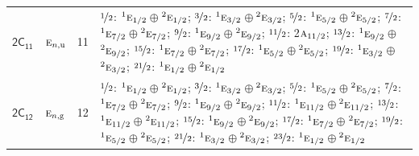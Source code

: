 \documentclass[10pt,a4paper]{article}
\numberwithin{equation}{section}
\newcommand{\grp}[1]{\mathsf{#1}}
\newcommand{\irr}[1]{\text{\normalfont\scshape #1}}
\newcommand{\conjpair}[1]{{}^{#1}}
\newcommand{\ptag}[1]{\mathrm{#1}}
\newlength{\fillwidth}\newlength{\cellwidth}\newlength{\colwidth}
\begin{document}
{\begin{longtable}{@{}llr>{\RaggedRight\arraybackslash}p{\fillwidth}@{}}
\href{2C11.pdf}{$\grp{2C_{11}}$} & $\irr{e}_{n,\ptag{u}}$ & 11 & $\nicefrac{1}{2}$: $\conjpair{1}\irr{e}_{1/2}$${}\oplus{}$$\conjpair{2}\irr{e}_{1/2}$; $\nicefrac{3}{2}$: $\conjpair{1}\irr{e}_{3/2}$${}\oplus{}$$\conjpair{2}\irr{e}_{3/2}$; $\nicefrac{5}{2}$: $\conjpair{1}\irr{e}_{5/2}$${}\oplus{}$$\conjpair{2}\irr{e}_{5/2}$; $\nicefrac{7}{2}$: $\conjpair{1}\irr{e}_{7/2}$${}\oplus{}$$\conjpair{2}\irr{e}_{7/2}$; $\nicefrac{9}{2}$: $\conjpair{1}\irr{e}_{9/2}$${}\oplus{}$$\conjpair{2}\irr{e}_{9/2}$; $\nicefrac{11}{2}$: 2$\irr{a}_{11/2}$; $\nicefrac{13}{2}$: $\conjpair{1}\irr{e}_{9/2}$${}\oplus{}$$\conjpair{2}\irr{e}_{9/2}$; $\nicefrac{15}{2}$: $\conjpair{1}\irr{e}_{7/2}$${}\oplus{}$$\conjpair{2}\irr{e}_{7/2}$; $\nicefrac{17}{2}$: $\conjpair{1}\irr{e}_{5/2}$${}\oplus{}$$\conjpair{2}\irr{e}_{5/2}$; $\nicefrac{19}{2}$: $\conjpair{1}\irr{e}_{3/2}$${}\oplus{}$$\conjpair{2}\irr{e}_{3/2}$; $\nicefrac{21}{2}$: $\conjpair{1}\irr{e}_{1/2}$${}\oplus{}$$\conjpair{2}\irr{e}_{1/2}$\\
\href{2C12.pdf}{$\grp{2C_{12}}$} & $\irr{e}_{n,\ptag{g}}$ & 12 & $\nicefrac{1}{2}$: $\conjpair{1}\irr{e}_{1/2}$${}\oplus{}$$\conjpair{2}\irr{e}_{1/2}$; $\nicefrac{3}{2}$: $\conjpair{1}\irr{e}_{3/2}$${}\oplus{}$$\conjpair{2}\irr{e}_{3/2}$; $\nicefrac{5}{2}$: $\conjpair{1}\irr{e}_{5/2}$${}\oplus{}$$\conjpair{2}\irr{e}_{5/2}$; $\nicefrac{7}{2}$: $\conjpair{1}\irr{e}_{7/2}$${}\oplus{}$$\conjpair{2}\irr{e}_{7/2}$; $\nicefrac{9}{2}$: $\conjpair{1}\irr{e}_{9/2}$${}\oplus{}$$\conjpair{2}\irr{e}_{9/2}$; $\nicefrac{11}{2}$: $\conjpair{1}\irr{e}_{11/2}$${}\oplus{}$$\conjpair{2}\irr{e}_{11/2}$; $\nicefrac{13}{2}$: $\conjpair{1}\irr{e}_{11/2}$${}\oplus{}$$\conjpair{2}\irr{e}_{11/2}$; $\nicefrac{15}{2}$: $\conjpair{1}\irr{e}_{9/2}$${}\oplus{}$$\conjpair{2}\irr{e}_{9/2}$; $\nicefrac{17}{2}$: $\conjpair{1}\irr{e}_{7/2}$${}\oplus{}$$\conjpair{2}\irr{e}_{7/2}$; $\nicefrac{19}{2}$: $\conjpair{1}\irr{e}_{5/2}$${}\oplus{}$$\conjpair{2}\irr{e}_{5/2}$; $\nicefrac{21}{2}$: $\conjpair{1}\irr{e}_{3/2}$${}\oplus{}$$\conjpair{2}\irr{e}_{3/2}$; $\nicefrac{23}{2}$: $\conjpair{1}\irr{e}_{1/2}$${}\oplus{}$$\conjpair{2}\irr{e}_{1/2}$\\

\end{longtable}}
\end{document}
